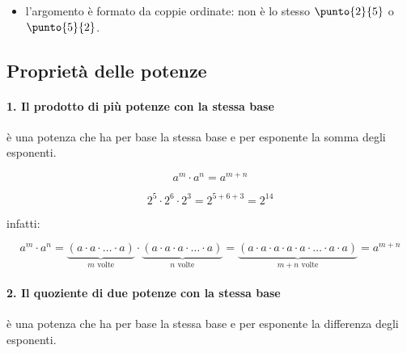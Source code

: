 \vspace{-1em}
\begin{osservazione}
\begin{itemize} [nosep]
\item l'argomento è formato da coppie ordinate: non è lo stesso 
\(\punto{2}{5}\) o \(\punto{5}{2}\).
\end{itemize}

\end{osservazione}

\subsection{Proprietà delle potenze}

\paragraph{1. Il prodotto di più potenze con la stessa base} 
è una potenza che ha per base la stessa base e per esponente la somma degli 
esponenti.

\begin{minipage}[c]{.35\textwidth}
\vspace{4.5mm}
 \[\boxed{a^m \cdot a^n = a^{m+n}}\]
\end{minipage}
\hfil
\begin{minipage}[c]{.35\textwidth}
\[ 2^5 \cdot 2^6 \cdot 2^3 = 2^{5+6+3}=2^{14}\]
\end{minipage}
\hfil
\begin{minipage}[c]{.25\textwidth}
\vspace{4.5mm}
\centering infatti:
\end{minipage}
\[ a^m \cdot a^n = \underbrace{(a\cdot a\cdot\ldots\cdot a)}_{m\text{ 
volte}}\cdot%
 \underbrace{(a\cdot a\cdot a\cdot\ldots\cdot a)}_{n\text{ volte}}
 =\underbrace{(a\cdot a\cdot a\cdot a\cdot a\cdot\ldots\cdot a\cdot 
a)}_{m+n\text{ volte}}%
 =a^{m+n}\]
\vspace{-1em}
\paragraph{2. Il quoziente di due potenze con la stessa base} 
è una potenza che ha per base la stessa base e per esponente la differenza 
degli esponenti.

